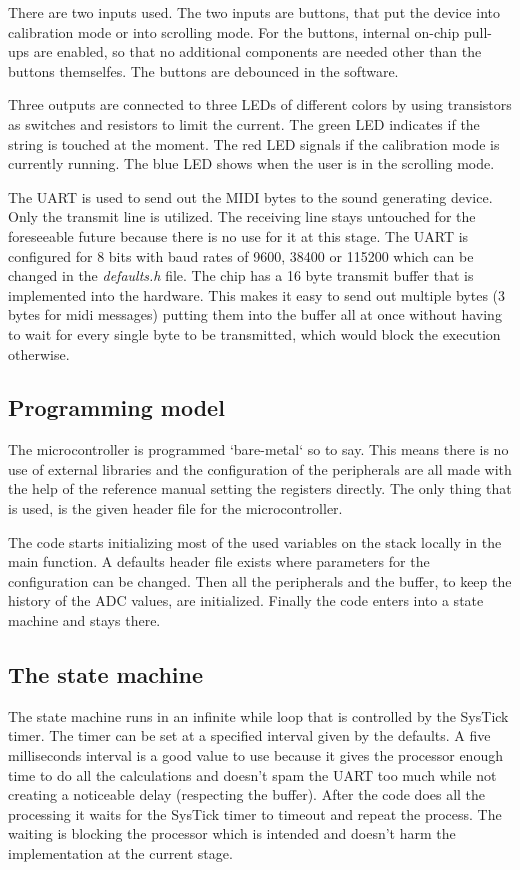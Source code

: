 \documentclass{article}
\begin{document}
There are two inputs used. The two inputs are buttons, that put the device into calibration mode or into scrolling mode. For the buttons, internal on-chip pull-ups are enabled, so that no additional components are needed other than the buttons themselfes. The buttons are debounced in the software.

Three outputs are connected to three LEDs of different colors by using transistors as switches and resistors to limit the current. The green LED indicates if the string is touched at the moment. The red LED signals if the calibration mode is currently running. The blue LED shows when the user is in the scrolling mode.

The UART is used to send out the MIDI bytes to the sound generating device. Only the transmit line is utilized. The receiving line stays untouched for the foreseeable future because there is no use for it at this stage. The UART is configured for 8 bits with baud rates of 9600, 38400 or 115200 which can be changed in the \textit{defaults.h} file. The chip has a 16 byte transmit buffer that is implemented into the hardware. This makes it easy to send out multiple bytes (3 bytes for midi messages) putting them into the buffer all at once without having to wait for every single byte to be transmitted, which would block the execution otherwise.

\subsection{Programming model}
The microcontroller is programmed `bare-metal` so to say. This means there is no use of external libraries and the configuration of the peripherals are all made with the help of the reference manual setting the registers directly. The only thing that is used, is the given header file for the microcontroller.

The code starts initializing most of the used variables on the stack locally in the main function. A defaults header file exists where parameters for the configuration can be changed. Then all the peripherals and the buffer, to keep the history of the ADC values, are initialized. Finally the code enters into a state machine and stays there.

\subsection{The state machine}

The state machine runs in an infinite while loop that is controlled by the SysTick timer. The timer can be set at a specified interval given by the defaults. A five milliseconds interval is a good value to use because it gives the processor enough time to do all the calculations and doesn't spam the UART too much while not creating a noticeable delay (respecting the buffer). After the code does all the processing it waits for the SysTick timer to timeout and repeat the process. The waiting is blocking the processor which is intended and doesn't harm the implementation at the current stage.
\end{document}
